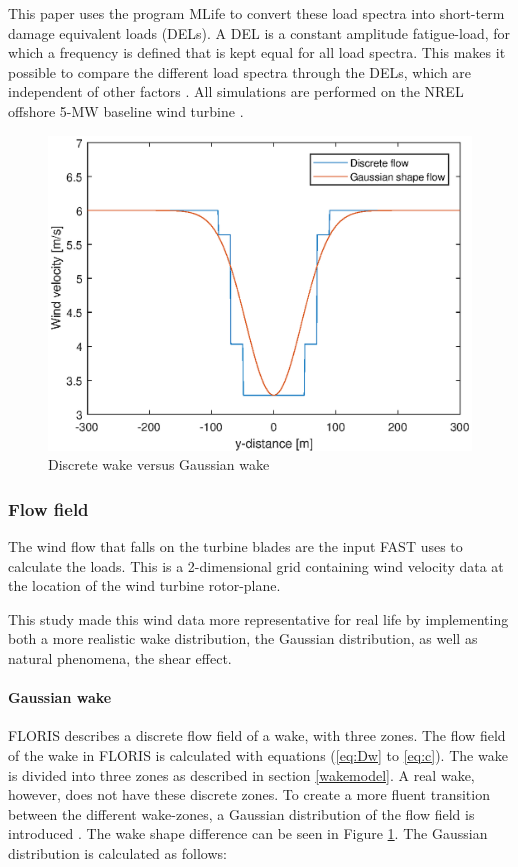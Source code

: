 This paper uses the program MLife to convert these load spectra into short-term damage equivalent loads (DELs). A DEL is a constant amplitude fatigue-load, for which a frequency is defined that is kept equal for all load spectra. This makes it possible to compare the different load spectra through the DELs, which are independent of other factors \cite{Wilson2017, MLife}. All simulations are performed on the NREL offshore 5-MW baseline wind turbine \cite{Jonkman2005}.


\begin{figure}
  \includegraphics[width=\linewidth]{./Figures/PlotGausDiscWakeDWake180U6yaw0.eps} %
  \caption{Discrete wake versus Gaussian wake} %
  \label{fig:disgaus}
\end{figure}


\subsubsection{Flow field} \label{sec:flowfield}
The wind flow that falls on the turbine blades are the input FAST uses to calculate the loads. This is a 2-dimensional grid containing wind velocity data at the location of the wind turbine rotor-plane.

This study made this wind data more representative for real life by implementing both a more realistic wake distribution, the Gaussian distribution, as well as natural phenomena, the shear effect.

\paragraph{Gaussian wake}
FLORIS describes a discrete flow field of a wake, with three zones. The flow field of the wake in FLORIS is calculated with equations (\ref{eq:Dw} to \ref{eq:c}). The wake is divided into three zones as described in section \ref{wakemodel}. A real wake, however, does not have these discrete zones. To create a more fluent transition between the different wake-zones, a Gaussian distribution of the flow field is introduced \cite{Bastankhah2016}. The wake shape difference can be seen in Figure \ref{fig:disgaus}.  The Gaussian distribution is calculated as follows: 

